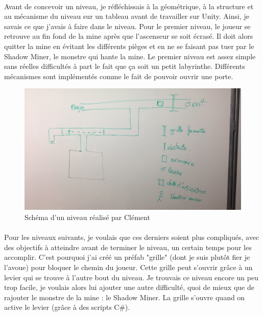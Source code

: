 \documentclass[titlepage, 13px, a4paper]{report}
\begin{document}
\paragraph*{} \hspace{0pt}
Avant de concevoir un niveau, je réfléchissais à la géométrique, à la structure et au 
mécanisme du niveau sur un tableau avant de travailler sur Unity. Ainsi, je savais ce 
que j'avais à faire dans le niveau. Pour le premier niveau, le joueur se retrouve au fin 
fond de la mine après que l'ascenseur se soit écrasé. Il doit alors quitter la mine en 
évitant les différents pièges et en ne se faisant pas tuer par le Shadow Miner, le monstre 
qui hante la mine. Le premier niveau est assez simple sans réelles difficultés à part le fait 
que ça soit un petit labyrinthe. Différents mécanismes sont implémentés comme le fait de 
pouvoir ouvrir une porte. \\

\begin{figure}[h!]
  \centering
  \includegraphics[scale=0.3]{images/clement_schema.png}
  \caption{Schéma d'un niveau réalisé par Clément}
\end{figure}

\newpage

\paragraph*{} \hspace{0pt}
Pour les niveaux suivants, je voulais que ces derniers soient plus compliqués, avec des 
objectifs à atteindre avant de terminer le niveau, un certain temps pour les accomplir. 
C'est pourquoi j'ai créé un préfab "grille" (dont je suis plutôt fier je l'avoue) pour bloquer 
le chemin du joueur. Cette grille peut s'ouvrir grâce à un levier qui se trouve à l'autre bout 
du niveau. Je trouvais ce niveau encore un peu trop facile, je voulais alors lui ajouter une autre 
difficulté, quoi de mieux que de rajouter le monstre de la mine : le Shadow Miner. La grille 
s'ouvre quand on active le levier (grâce à des scripts C\#).  \\
\end{document}
